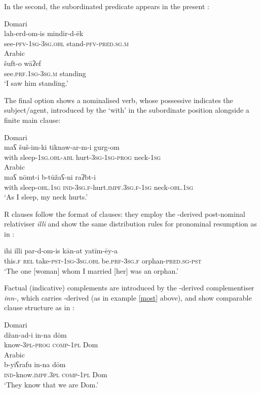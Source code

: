 \documentclass[output=paper]{langsci/langscibook}
\begin{document}
In the second, the subordinated predicate appears in the present :

\ea
\ea
{Domari}\\
\gll lah-erd-om-is mindir-d-ēk    \\
       see-\textsc{pfv-1sg-3sg.obl} stand-\textsc{pfv-pred.sg.m}\\
 
\ex
{Arabic}\\
\gll šuft-o   wāʔef    \\
     see.\textsc{prf.1sg-3sg.m} standing\\
\glt ‘I saw him standing.’
\z
\z

The final option shows a nominalised verb, whose possessive  indicates the subject/agent, introduced by the  ‘with’ in the subordinate position alongside a finite main clause:

\ea
\ea
{Domari}\\
\gll maʕ šuš-im-ki tiknaw-ar-m-i gurg-om  \\
       with sleep-\textsc{1sg.obl-abl} hurt-\textsc{3sg-1sg-prog} neck-1\textsc{sg}\\



\ex
{Arabic}\\
\gll maʕ nōmt-i b-tūžaʕ-ni raʔbt-i  \\
       with sleep-\textsc{obl.1sg} \textsc{ind-3sg.f}-hurt.\textsc{impf.3sg.f-1sg} neck-\textsc{obl.1sg}\\
\glt       ‘As I sleep, my neck hurts.’
\z
\z

R clauses follow the format of   clauses: they employ the -derived post-nominal relativiser \textit{illi} and show the same distribution rules for pronominal resumption as in :

\ea \gll   ihi illi par-d-om-is kān-at yatīm-ēy-a\\
       this.\textsc{f} \textsc{rel} take-\textsc{pst-1sg-3sg.obl} be.\textsc{prf-3sg.f} orphan-\textsc{pred.sg-pst}\\
\glt   ‘The one [woman] whom I married [her] was an orphan.’
\z

Factual (indicative) complements are introduced by the -derived complementiser \textit{inn-}, which carries -derived  (as in example \ref{most} above), and show comparable clause structure as in :

\ea
\ea
{Domari}\\
\gll džan-ad-i in-na dōm    \\
     know-\textsc{3pl-prog} \textsc{comp}-\textsc{1pl} Dom\\
\ex
{Arabic}\\
\gll b-yiʕrafu in-na dōm  \\
     \textsc{ind}-know.\textsc{impf.3pl} \textsc{comp}-\textsc{1pl} Dom\\
\glt ‘They know that we are Dom.’
\z
\z
\end{document}

